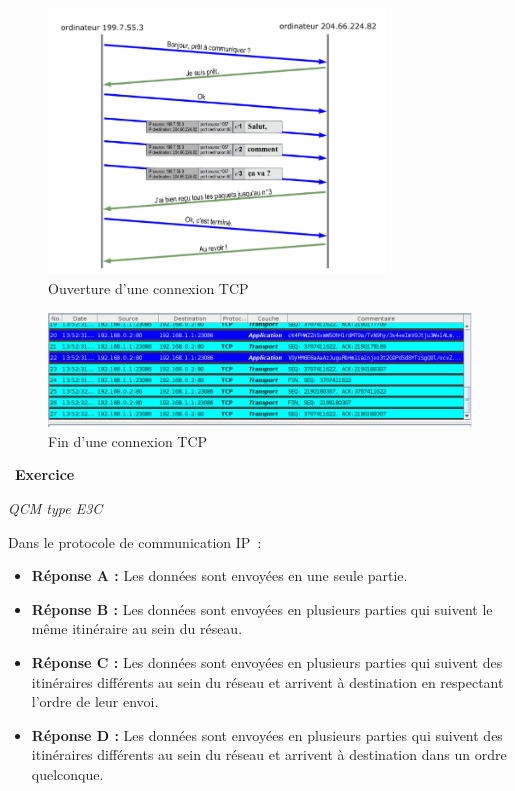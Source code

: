 \documentclass[
  11pt,
]{article}
\providecommand{\tightlist}{%
  \setlength{\itemsep}{0pt}\setlength{\parskip}{0pt}}
\newcounter{exo}
\newenvironment{exercice}[1]
{\par \medskip   \addtocounter{exo}{1} \noindent  
\begin{bclogo}[arrondi =0.1,   noborder = true, logo=\bccrayon, marge=4]{~\textbf{Exercice} \textbf{\theexo} {\itshape #1} }  \par}
{
\end{bclogo}
 \par \bigskip }
\begin{document}
\begin{figure}
\centering
\includegraphics[width=0.8\textwidth,height=\textheight]{images/TCP1.png}
\caption{Ouverture d'une connexion TCP}
\end{figure}

\begin{figure}
\centering
\includegraphics[width=1\textwidth,height=\textheight]{images/filius-tcp2.png}
\caption{Fin d'une connexion TCP}
\end{figure}

\begin{exercice}{}

\emph{QCM type E3C}

Dans le protocole de communication IP~:

\begin{itemize}
\tightlist
\item
  \textbf{Réponse A :} Les données sont envoyées en une seule partie.
\item
  \textbf{Réponse B :} Les données sont envoyées en plusieurs parties
  qui suivent le même itinéraire au sein du réseau.
\item
  \textbf{Réponse C :} Les données sont envoyées en plusieurs parties
  qui suivent des itinéraires différents au sein du réseau et arrivent à
  destination en respectant l'ordre de leur envoi.
\item
  \textbf{Réponse D :} Les données sont envoyées en plusieurs parties
  qui suivent des itinéraires différents au sein du réseau et arrivent à
  destination dans un ordre quelconque.
\end{itemize}

\end{exercice}
\end{document}
